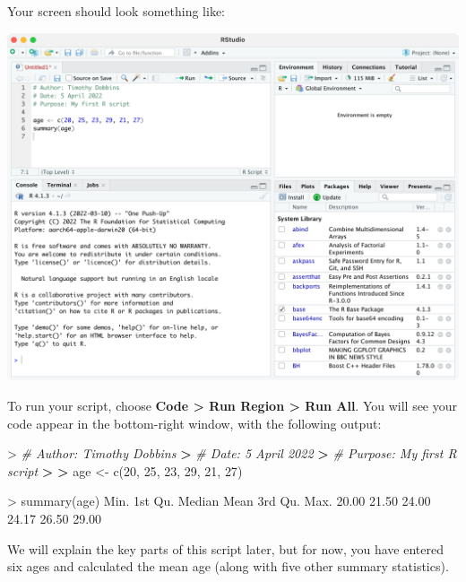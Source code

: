 \documentclass[
]{memoir}
\newenvironment{Shaded}{\begin{snugshade}}{\end{snugshade}}
\newcommand{\CommentTok}[1]{\textcolor[rgb]{0.56,0.35,0.01}{\textit{#1}}}
\newcommand{\DecValTok}[1]{\textcolor[rgb]{0.00,0.00,0.81}{#1}}
\newcommand{\ErrorTok}[1]{\textcolor[rgb]{0.64,0.00,0.00}{\textbf{#1}}}
\newcommand{\FloatTok}[1]{\textcolor[rgb]{0.00,0.00,0.81}{#1}}
\newcommand{\FunctionTok}[1]{\textcolor[rgb]{0.00,0.00,0.00}{#1}}
\newcommand{\NormalTok}[1]{#1}
\newcommand{\OtherTok}[1]{\textcolor[rgb]{0.56,0.35,0.01}{#1}}
\newcommand{\SpecialCharTok}[1]{\textcolor[rgb]{0.00,0.00,0.00}{#1}}
\begin{document}
Your screen should look something like:

\includegraphics[width=1\linewidth]{img/RStudio-screenshot-02}

To run your script, choose \textbf{Code \textgreater{} Run Region \textgreater{} Run All}. You will see your code appear in the bottom-right window, with the following output:

\begin{Shaded}
\begin{Highlighting}[]
\SpecialCharTok{\textgreater{}} \CommentTok{\# Author: Timothy Dobbins}
\ErrorTok{\textgreater{}} \CommentTok{\# Date: 5 April 2022}
\ErrorTok{\textgreater{}} \CommentTok{\# Purpose: My first R script}
\ErrorTok{\textgreater{}} 
\ErrorTok{\textgreater{}}\NormalTok{ age }\OtherTok{\textless{}{-}} \FunctionTok{c}\NormalTok{(}\DecValTok{20}\NormalTok{, }\DecValTok{25}\NormalTok{, }\DecValTok{23}\NormalTok{, }\DecValTok{29}\NormalTok{, }\DecValTok{21}\NormalTok{, }\DecValTok{27}\NormalTok{)}

\SpecialCharTok{\textgreater{}} \FunctionTok{summary}\NormalTok{(age)}
\NormalTok{   Min. 1st Qu.  Median    Mean 3rd Qu.    Max. }
  \FloatTok{20.00}   \FloatTok{21.50}   \FloatTok{24.00}   \FloatTok{24.17}   \FloatTok{26.50}   \FloatTok{29.00} 
\end{Highlighting}
\end{Shaded}

We will explain the key parts of this script later, but for now, you have entered six ages and calculated the mean age (along with five other summary statistics).
\end{document}
